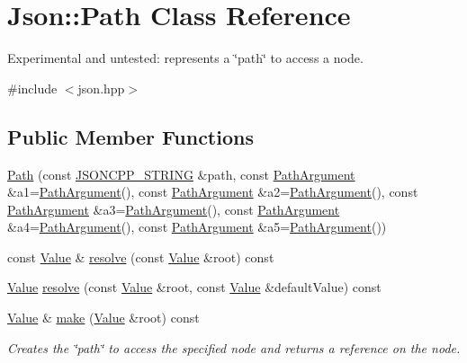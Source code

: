 \hypertarget{classJson_1_1Path}{}\section{Json\+:\+:Path Class Reference}
\label{classJson_1_1Path}


Experimental and untested\+: represents a \char`\"{}path\char`\"{} to access a node.  




{\ttfamily \#include $<$json.\+hpp$>$}

\subsection*{Public Member Functions}
\begin{DoxyCompactItemize}
\item 
\hyperlink{classJson_1_1Path_a7356c0e9c1fc2276390fd396271c1300}{Path} (const \hyperlink{json_8hpp_a1e723f95759de062585bc4a8fd3fa4be}{J\+S\+O\+N\+C\+P\+P\+\_\+\+S\+T\+R\+I\+NG} \&path, const \hyperlink{classJson_1_1PathArgument}{Path\+Argument} \&a1=\hyperlink{classJson_1_1PathArgument}{Path\+Argument}(), const \hyperlink{classJson_1_1PathArgument}{Path\+Argument} \&a2=\hyperlink{classJson_1_1PathArgument}{Path\+Argument}(), const \hyperlink{classJson_1_1PathArgument}{Path\+Argument} \&a3=\hyperlink{classJson_1_1PathArgument}{Path\+Argument}(), const \hyperlink{classJson_1_1PathArgument}{Path\+Argument} \&a4=\hyperlink{classJson_1_1PathArgument}{Path\+Argument}(), const \hyperlink{classJson_1_1PathArgument}{Path\+Argument} \&a5=\hyperlink{classJson_1_1PathArgument}{Path\+Argument}())
\item 
const \hyperlink{classJson_1_1Value}{Value} \& \hyperlink{classJson_1_1Path_ae1d05fa985a6ee3c57f2b8ed186b5982}{resolve} (const \hyperlink{classJson_1_1Value}{Value} \&root) const 
\item 
\hyperlink{classJson_1_1Value}{Value} \hyperlink{classJson_1_1Path_a33d1749770a4cf74e9a3de419bc7febe}{resolve} (const \hyperlink{classJson_1_1Value}{Value} \&root, const \hyperlink{classJson_1_1Value}{Value} \&default\+Value) const 
\item 
\hyperlink{classJson_1_1Value}{Value} \& \hyperlink{classJson_1_1Path_a5289901fc58ad1fdca1de7fb5a0b620c}{make} (\hyperlink{classJson_1_1Value}{Value} \&root) const 
\begin{DoxyCompactList}\small\item\em Creates the \char`\"{}path\char`\"{} to access the specified node and returns a reference on the node. \end{DoxyCompactList}\end{DoxyCompactItemize}

